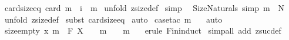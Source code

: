 \begin{isabellebody}
%
\endisadelimproof
\isanewline
\isanewline
{}\isamarkupfalse%
\ card{\isacharunderscore}size{\isacharunderscore}eq{\isacharcolon}\ {\isachardoublequoteopen}{\isacharparenleft}card\ m{\isacharparenright}\ {\isacharequal}\ {\isacharparenleft}{\isachardollar}i\ {\isacharparenleft}{\isacharhash}\ m{\isacharparenright}{\isacharparenright}{\isachardoublequoteclose}\isanewline
%
\isadelimproof
%
\endisadelimproof
%
\isatagproof
{}\isamarkupfalse%
\ {\isacharparenleft}unfold\ zsize{\isacharunderscore}def{\isacharparenright}\isanewline
{}\isamarkupfalse%
\ simp\ \isanewline
{}\isamarkupfalse%
%
\endisatagproof
{\isafoldproof}%
%
\isadelimproof
\isanewline
%
\endisadelimproof
\isanewline
{}\isamarkupfalse%
\ Size{\isacharunderscore}Naturals\ {\isacharbrackleft}simp{\isacharbrackright}{\isacharcolon}\ {\isachardoublequoteopen}{\isacharhash}m\ {\isacharcolon}\ {\isacharpercent}N{\isachardoublequoteclose}\isanewline
%
\isadelimproof
%
\endisadelimproof
%
\isatagproof
{}\isamarkupfalse%
\ {\isacharparenleft}unfold\ zsize{\isacharunderscore}def{\isacharparenright}\isanewline
{}\isamarkupfalse%
\ {\isacharparenleft}subst\ card{\isacharunderscore}size{\isacharunderscore}eq{\isacharparenright}\isanewline
{}\isamarkupfalse%
\ auto\isanewline
{}\isamarkupfalse%
\ {\isacharparenleft}case{\isacharunderscore}tac\ {\isachardoublequoteopen}{\isacharhash}m\ {\isacharequal}\ {}{\isachardoublequoteclose}{\isacharparenright}\isanewline
{}\isamarkupfalse%
\ auto\isanewline
{}\isamarkupfalse%
%
\endisatagproof
{\isafoldproof}%
%
\isadelimproof
\isanewline
%
\endisadelimproof
\isanewline
\isanewline
{}\isamarkupfalse%
\ size{\isacharunderscore}empty{}{\isacharcolon}\ {\isachardoublequoteopen}{\isacharbang}{\isacharbang}x{\isachardot}\ m\ {\isacharcolon}\ {\isacharpercent}F\ X\ \ {\isacharequal}{\isacharequal}{\isachargreater}\ {\isacharparenleft}{\isacharhash}\ m\ {\isacharequal}\ {}{\isacharparenright}\ {\isacharequal}\ {\isacharparenleft}m\ {\isacharequal}\ {\isacharbraceleft}{\isacharbraceright}{\isacharparenright}{\isachardoublequoteclose}\isanewline
%
\isadelimproof
%
\endisadelimproof
%
\isatagproof
{}\isamarkupfalse%
\ {\isacharparenleft}erule\ Fin{\isacharunderscore}induct{\isacharparenright}\isanewline
{}\isamarkupfalse%
\ {\isacharparenleft}simp{\isacharunderscore}all\ add{\isacharcolon}\ zsuc{\isacharunderscore}def{\isacharparenright}\isanewline

\end{isabellebody}
